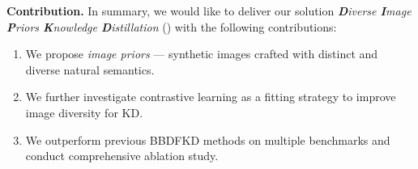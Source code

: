 \begin{foldable} %
    \textbf{Contribution.} In summary, we would like to deliver our solution \textit{\textbf{D}iverse \textbf{I}mage \textbf{P}riors \textbf{K}nowledge \textbf{D}istillation} (\textbf{\methodname}) with the following contributions:
    \begin{enumerate}
        \item We propose \textit{image priors} --- synthetic images crafted with distinct and diverse natural semantics.
        \item We further investigate contrastive learning as a fitting strategy to improve image diversity for KD.
        \item We outperform previous BBDFKD methods on multiple benchmarks and conduct comprehensive ablation study.
    \end{enumerate}
\end{foldable}
